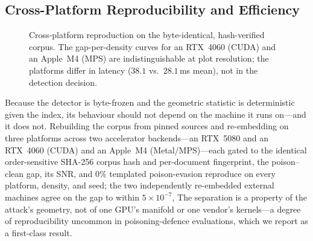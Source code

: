 \documentclass[10pt,journal,compsoc]{IEEEtran}
\begin{document}
\subsection{Cross-Platform Reproducibility and Efficiency}
\label{subsec:eff}

\begin{figure}[t]
\centering
{}
\caption{Cross-platform reproduction on the byte-identical, hash-verified corpus. The gap-per-density curves for an RTX~4060 (CUDA) and an Apple~M4 (MPS) are indistinguishable at plot resolution; the platforms differ in latency ($38.1$ vs.\ $28.1$\,ms mean), not in the detection decision.}
\label{fig:xplat}
\end{figure}
Because the detector is byte-frozen and the geometric statistic is deterministic given the
index, its behaviour should not depend on the machine it runs on---and it does not. Rebuilding
the corpus from pinned sources and re-embedding on three platforms across two accelerator
backends---an RTX~5080 and an RTX~4060 (CUDA) and an Apple~M4 (Metal/MPS)---each gated to the
identical order-sensitive SHA-256 corpus hash and per-document fingerprint, the poison--clean
gap, its SNR, and $0\%$ templated poison-evasion reproduce on every platform, density, and seed;
the two independently re-embedded external machines agree on the gap to within $5\times10^{-7}$,
The separation is a property of the attack's
geometry, not of one GPU's manifold or one vendor's kernels---a degree of reproducibility
uncommon in poisoning-defence evaluations, which we report as a first-class result.
\end{document}
